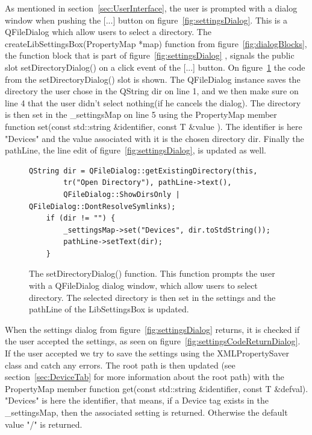As mentioned in section~\ref{sec:UserInterface}, the user is prompted with a dialog window when pushing the [...] button on figure~\ref{fig:settingsDialog}. This is a QFileDialog \cite{QtDocumentationQFileDialog} which allow users to select a directory. The createLibSettingsBox(PropertyMap *map) function from figure~\ref{fig:dialogBlocks}, the function block that is part of figure~\ref{fig:settingsDialog} , signals the public slot setDirectoryDialog() on a click event of the [...] button. On figure~\ref{fig:settingsCodeQFileDialog} the code from the setDirectoryDialog() slot is shown. The QFileDialog instance saves the directory the user chose in the QString dir on line 1, and we then make sure on line 4 that the user didn't select nothing(if he cancels the dialog). The directory is then set in the \_settingsMap on line 5 using the PropertyMap member function set(const std::string \&identifier, const T \&value ). The identifier is here "Devices" and the value associated with it is the chosen directory dir. Finally the pathLine, the line edit of figure~\ref{fig:settingsDialog}, is updated as well.

\begin{figure}[h] %
\centering
\lstset{language=C++} 
\begin{lstlisting}[frame=single]  
QString dir = QFileDialog::getExistingDirectory(this, 
		tr("Open Directory"), pathLine->text(),
	    QFileDialog::ShowDirsOnly | QFileDialog::DontResolveSymlinks);
    if (dir != "") {
        _settingsMap->set("Devices", dir.toStdString());
        pathLine->setText(dir);
    }
\end{lstlisting}
\caption{The setDirectoryDialog() function. This function prompts the user with a QFileDialog dialog window, which allow users to select directory. The selected directory is then set in the settings and the pathLine of the LibSettingsBox is updated.}
\label{fig:settingsCodeQFileDialog} 	
\end{figure}

When the settings dialog from figure~\ref{fig:settingsDialog} returns, it is checked if the user accepted the settings,  as seen on figure~\ref{fig:settingsCodeReturnDialog}. If the user accepted we try to save the settings using the XMLPropertySaver \cite{XMLPropertySaver} class and catch any errors. The root path is then updated (see section~\ref{sec:DeviceTab} for more information about the root path) with the PropertyMap member function get(const std::string \&identifier, const T \&defval). "Devices" is here the identifier, that means, if a Device tag exists in the \_settingsMap, then the associated setting is returned. Otherwise the default value "/" is returned.

